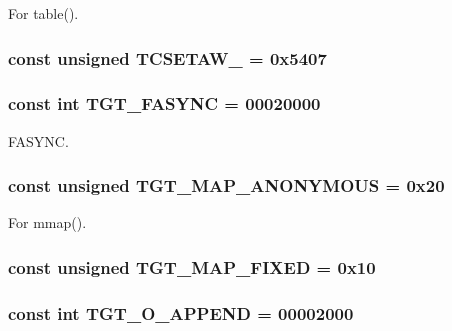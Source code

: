 For table(). \hypertarget{classArmLinux64_a81c076b60e8728fd6d28a5ea28b6731e}{
\subsubsection[{TCSETAW\_\-}]{\setlength{\rightskip}{0pt plus 5cm}const unsigned {\bf TCSETAW\_\-} = 0x5407}}
\label{classArmLinux64_a81c076b60e8728fd6d28a5ea28b6731e}
\hypertarget{classArmLinux64_ab23d73086673a1279fc508b68fc47191}{
\subsubsection[{TGT\_\-FASYNC}]{\setlength{\rightskip}{0pt plus 5cm}const int {\bf TGT\_\-FASYNC} = 00020000}}
\label{classArmLinux64_ab23d73086673a1279fc508b68fc47191}


FASYNC. \hypertarget{classArmLinux64_a0bbc267200567dd98250b99b6085a499}{
\subsubsection[{TGT\_\-MAP\_\-ANONYMOUS}]{\setlength{\rightskip}{0pt plus 5cm}const unsigned {\bf TGT\_\-MAP\_\-ANONYMOUS} = 0x20}}
\label{classArmLinux64_a0bbc267200567dd98250b99b6085a499}


For mmap(). \hypertarget{classArmLinux64_a0124e421d7846143bca15728b7a53e14}{
\subsubsection[{TGT\_\-MAP\_\-FIXED}]{\setlength{\rightskip}{0pt plus 5cm}const unsigned {\bf TGT\_\-MAP\_\-FIXED} = 0x10}}
\label{classArmLinux64_a0124e421d7846143bca15728b7a53e14}
\hypertarget{classArmLinux64_af11adc5404ea3780a5ce2829cc3710b7}{
\subsubsection[{TGT\_\-O\_\-APPEND}]{\setlength{\rightskip}{0pt plus 5cm}const int {\bf TGT\_\-O\_\-APPEND} = 00002000}}
\label{classArmLinux64_af11adc5404ea3780a5ce2829cc3710b7}



